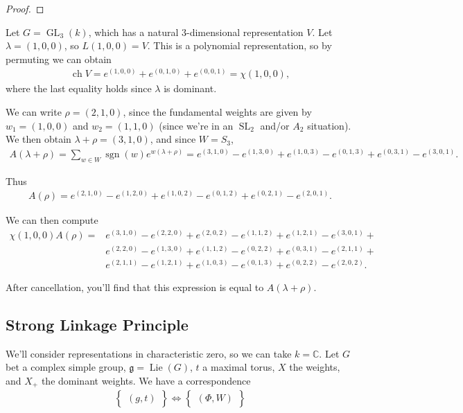 \begin{proof}
\end{proof}

\begin{example}

Let \(G = \operatorname{GL}_3(k)\), which has a natural 3-dimensional
representation \(V\). Let \(\lambda = (1,0,0)\), so \(L(1,0,0) = V\).
This is a polynomial representation, so by permuting we can obtain
\begin{align*}  
\operatorname{ch}V = e^{(1,0,0)} + e^{(0,1,0)} + e^{(0,0,1)} = \chi(1,0,0)
,\end{align*}
where the last equality holds since \(\lambda\) is dominant.

We can write \(\rho = (2,1,0)\), since the fundamental weights are given
by \(w_1 = (1,0,0)\) and \(w_2 = (1,1,0)\) (since we're in an
\({\operatorname{SL}}_2\) and/or \(A_2\) situation). We then obtain
\(\lambda + \rho = (3,1,0)\), and since \(W= S_3\),
\begin{align*}  
A(\lambda + \rho) = \sum_{w\in W} \operatorname{sgn}(w) e^{w(\lambda + \rho)}
=
e^{(3,1,0)} -
e^{(1,3,0)} + 
e^{(1,0,3)} - 
e^{(0,1,3)} + 
e^{(0,3,1)} - 
e^{(3,0,1)}
.\end{align*}

Thus
\begin{align*}  
A(\rho) =
e^{(2,1,0)} -
e^{(1,2,0)} + 
e^{(1,0,2)} - 
e^{(0,1,2)} + 
e^{(0,2,1)} - 
e^{(2,0,1)}
.\end{align*}

We can then compute
\begin{align*}  
\chi(1,0,0) A(\rho) = &e^{(3,1,0)}
- e^{(2,2,0)} + 
e^{(2,0,2)} 
-e^{(1,1,2)} + 
e^{(1,2,1)}
- e^{(3,0,1)} + 
\\
&e^{(2,2,0)} -
e^{(1,3,0)} + 
e^{(1,1,2)} - 
e^{(0,2,2)} + 
e^{(0,3,1)} - 
e^{(2,1,1)} + 
\\
&e^{(2,1,1)} -
e^{(1,2,1)} + 
e^{(1,0,3)} - 
e^{(0,1,3)} + 
e^{(0,2,2)} - 
e^{(2,0,2)}
.\end{align*}

After cancellation, you'll find that this expression is equal to
\(A(\lambda + \rho)\).

\end{example}

\hypertarget{strong-linkage-principle}{%
\subsection{Strong Linkage Principle}\label{strong-linkage-principle}}

We'll consider representations in characteristic zero, so we can take
\(k={\mathbb{C}}\). Let \(G\) bet a complex simple group,
\({\mathfrak{g}}= \operatorname{Lie}(G)\), \(t\) a maximal torus, \(X\)
the weights, and \(X_+\) the dominant weights. We have a correspondence
\Large
\begin{align*}  
\left\{{\substack{(g, t)}}\right\} \iff
\left\{{\substack{(\Phi, W)}}\right\}
\end{align*}
\normalsize

